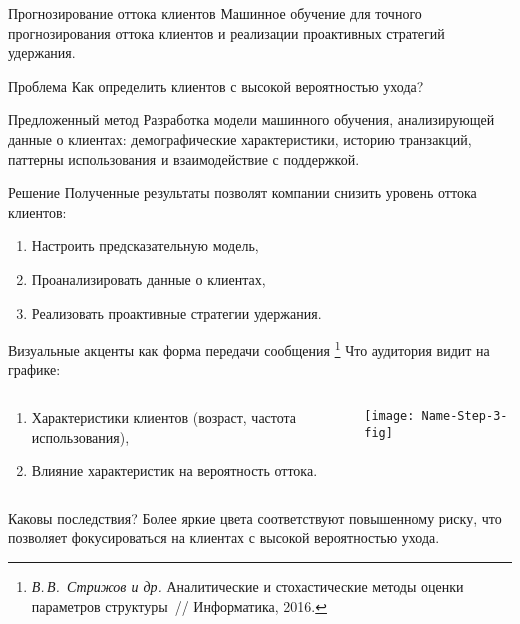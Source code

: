 \begin{frame}{Прогнозирование оттока клиентов}
Машинное обучение для точного прогнозирования оттока клиентов и реализации проактивных стратегий удержания.

\begin{block}{Проблема}
Как определить клиентов с высокой вероятностью ухода?
\end{block}

\begin{block}{Предложенный метод}
Разработка модели машинного обучения, анализирующей данные о клиентах: демографические характеристики, историю транзакций, паттерны использования и взаимодействие с поддержкой.
\end{block}

\begin{block}{Решение}
Полученные результаты позволят компании снизить уровень оттока клиентов:
\begin{enumerate}[1)]
    \item Настроить предсказательную модель,
    \item Проанализировать данные о клиентах,
    \item Реализовать проактивные стратегии удержания.
\end{enumerate}
\end{block}
\end{frame}

\begin{frame}{Визуальные акценты как форма передачи сообщения%
\footnote{\textit{В.\,В.~Стрижов и др.} Аналитические и стохастические методы оценки параметров структуры~// Информатика, 2016.}}
Что аудитория видит на графике:
\begin{columns}
\begin{column}{0.3\textwidth}
\begin{enumerate}[1)]
    \item Характеристики клиентов (возраст, частота использования),
    \item Влияние характеристик на вероятность оттока.
\end{enumerate}
\end{column}
\begin{column}{0.7\textwidth}
    \texttt{[image: Name-Step-3-fig]}      
\end{column}
\end{columns}
\bigskip
Каковы последствия? Более яркие цвета соответствуют повышенному риску, что позволяет фокусироваться на клиентах с высокой вероятностью ухода.
\end{frame}
